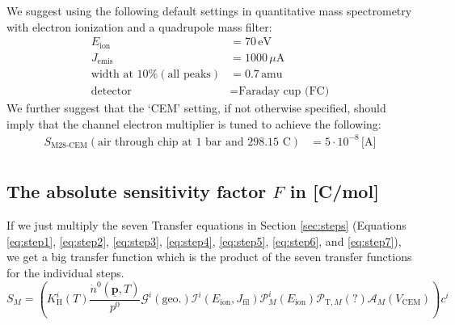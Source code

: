 \documentclass{article}
\renewcommand{\vec}[1]{\underline{\mathbf{#1}}}
\begin{document}
We suggest using the following default settings in quantitative mass spectrometry with electron ionization and a quadrupole mass filter:
\begin{align}
E_\text{ion} &= 70\,\text{eV} \\
J_\text{emis} &= 1000\,\mu\text{A} \\
\text{width at 10\%}(\text{all peaks}) &= 0.7 \, \text{amu} \\
\text{detector} &= \text{Faraday cup (FC)}
\end{align}
We further suggest that the `CEM' setting, if not otherwise specified, should imply that the channel electron multiplier is tuned to achieve the following:
\begin{align}
S_\text{M28-CEM}(\text{air through chip at 1 bar and 298.15 C}) &= 5 \cdot 10^{-8}\,\text{[A]} \\
\end{align}

\subsection{The absolute sensitivity factor $F$ in [C/mol]}\label{sec:F}

If we just multiply the seven Transfer equations in Section \ref{sec:steps} (Equations \ref{eq:step1}, \ref{eq:step2}, \ref{eq:step3}, \ref{eq:step4}, \ref{eq:step5}, \ref{eq:step6}, and \ref{eq:step7}), we get a big transfer function which is the product of the seven transfer functions for the individual steps.
\begin{equation}
S_M = \left(
K_\text{H}^i(T)
\frac{\dot{n}^0(\vec{p}, T)}{p^0} 
\mathcal{G}^i(\text{geo.}) 
\mathcal{I}^i(E_\text{ion}, J_\text{fil})
\mathcal{P}^i_{M}(E_\text{ion})
\mathcal{P}_{\text{T},M}(\text{?})
\mathcal{A}_M(V_\text{CEM})
\right) c^i 
\end{equation}
\end{document}
